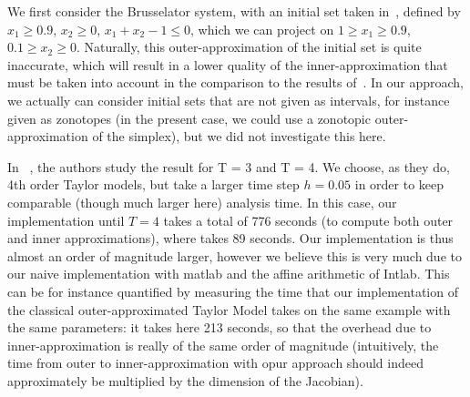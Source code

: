 
We first consider the Brusselator system, with an initial set taken in~\cite{Underapproxflowpipes}, defined by 
$x_1 \geq 0.9$, $x_2 \geq 0$, $x_1+x_2-1 \leq 0$, which we can project on $1 \geq x_1 \geq 0.9$, $0.1 \geq x_2 \geq 0$.
Naturally, this outer-approximation of the initial set is quite inaccurate, which will result in a lower quality of the inner-approximation
that must be taken into account in the comparison to the results of~\cite{Underapproxflowpipes}. In our approach, 
we actually can consider initial sets that are not given as intervals, for instance given as zonotopes 
(in the present case, we could use a zonotopic outer-approximation of the simplex),  
but we did not investigate this here. 

In ~\cite{Underapproxflowpipes}, the authors study the result for T = 3 and T = 4. We choose, as they do, 4th order Taylor models, 
but take a larger time step $h=0.05$ in order to keep comparable (though much larger here) analysis time. In this case, our implementation until $T=4$
takes a total of 776 seconds (to compute both outer and inner approximations), where \cite{Underapproxflowpipes} takes 89 seconds.
Our implementation is thus almost an order of magnitude larger, however we believe this is very much due to our naive implementation 
with matlab and the affine arithmetic of Intlab. This can be for instance quantified by measuring the time  that our implementation of the classical 
outer-approximated Taylor Model takes on the same example with the same parameters: it takes here 213 seconds, so that the overhead due to inner-approximation 
is really of the same order of magnitude (intuitively, the time from outer to inner-approximation with opur approach should indeed approximately 
be multiplied by the dimension of the Jacobian). 

